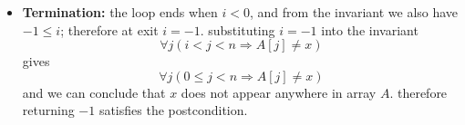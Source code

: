 \documentclass{article}
\theoremstyle{remark}
\begin{document}
\begin{enumerate}
\begin{itemize}
\begin{enumerate}
            from the invariant we already know that for all indices \(j\) with \(i < j < n\), \(A[j] \ne x\),
            since the current index \(i\) contains \(x\) and no index to the right of \(i\) contains \(x\), index \(i\) is the last occurrence of \(x\), 
            and therefore returning \(i\) satisfies the postcondition.

            \item case 2: when \(A[i] \ne x\).  
            the code executes \(i = i - 1\). Let \(i' = i - 1\)
            for any \(j\) with \(i' < j < n\), either
            \begin{itemize}
                \item \(j = i\), in which case \(A[j] = A[i] \ne x\), or
                \item \(j > i\), in which case \(A[j] \ne x\) by the invariant.
            \end{itemize}
            thus
            \[
            \forall j (i' < j < n \Rightarrow A[j] \ne x)
            \]
            and together with \(-1 \le i' \le n-1\), the loop invariant still holds.
        \end{enumerate}

        \item \textbf{Termination: }  
        the loop ends when \(i < 0\), and from the invariant we also have \(-1 \le i\); therefore at exit \(i = -1\).  
        substituting \(i = -1\) into the invariant
        \[
        \forall j (i < j < n \Rightarrow A[j] \ne x)
        \]
        gives
        \[
        \forall j (0 \le j < n \Rightarrow A[j] \ne x)
        \]
        and we can conclude that \(x\) does not appear anywhere in array \(A\). therefore returning \(-1\) satisfies the postcondition.
    \end{itemize}
\end{enumerate}

\vspace{1em}
\hrulefill
\end{document}
